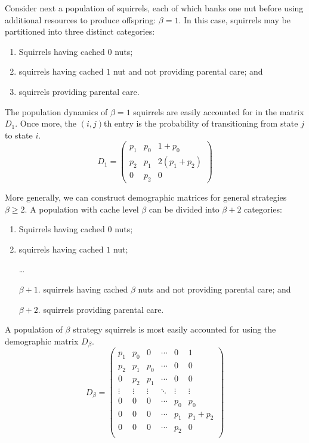 \documentclass[titlepage, hidelinks, 12pt]{article}
\theoremstyle{plain}
\theoremstyle{remark}
\theoremstyle{definition}
\begin{document}
Consider next a population of squirrels, each of which banks one nut before using additional resources to produce offspring: $\beta =1$. 
In this case, squirrels may be partitioned into three distinct categories:
\begin{enumerate}
    \item Squirrels having cached $0$ nuts;
    \item squirrels having cached $1$ nut and not providing parental care; and
    \item squirrels providing parental care.
\end{enumerate}
The population dynamics of  $\beta = 1$ squirrels are easily accounted for in the matrix $D_1$. Once more, the $(i,j)$th entry is the
probability of transitioning from state $j$ to state $i$.
\begin{equation}
D_1 =
\begin{pmatrix}
    p_1 & p_0 & 1+p_0 \\ p_2 & p_1 & 2(p_1 + p_2) \\ 0 & p_2 & 0
\end{pmatrix}
    \label{eqn:D1}
\end{equation}

More generally, we can construct demographic matrices for general strategies $\beta \ge 2$. 
A population with cache level $\beta$ can be divided into $\beta+2$ categories:
\begin{enumerate}
    \item Squirrels having cached $0$ nuts;
    \item squirrels having cached $1$ nut;
    \item []\dots
    \item[$\beta+1$.] squirrels having cached $\beta$ nuts and not providing parental care; and
    \item[$\beta+2$.] squirrels providing parental care. 
\end{enumerate}
A population of $\beta$ strategy squirrels is most easily accounted for using the demographic matrix $D_\beta$. 
\begin{equation}
D_\beta =
\begin{pmatrix}
    p_1 & p_0 & 0 & \cdots & 0 & 1 \\
    p_2 & p_1 & p_0 & \cdots & 0 & 0 \\
    0 & p_2 & p_1 & \cdots & 0 & 0 \\
    \vdots & \vdots & \vdots & \ddots & \vdots & \vdots \\
    0 & 0 & 0 & \cdots & p_0 & p_0 \\ 
    0 & 0 & 0 & \cdots & p_1 & p_1 + p_2 \\ 
    0 & 0 & 0 & \cdots & p_2 & 0 \\ 
\end{pmatrix}
    \label{eqn:Dbeta}
\end{equation}
\end{document}
